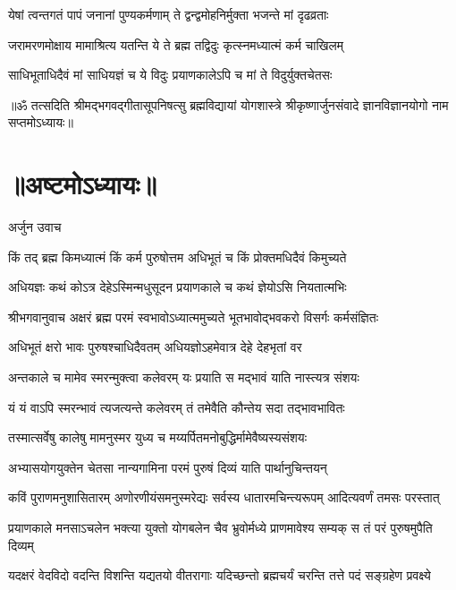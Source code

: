\twolineshloka
{येषां त्वन्तगतं पापं जनानां पुण्यकर्मणाम्}
{ते द्वन्द्वमोहनिर्मुक्ता भजन्ते मां दृढव्रताः}%

\twolineshloka
{जरामरणमोक्षाय मामाश्रित्य यतन्ति ये}
{ते ब्रह्म तद्विदुः कृत्स्नमध्यात्मं कर्म चाखिलम्}%

\twolineshloka
{साधिभूताधिदैवं मां साधियज्ञं च ये विदुः}
{प्रयाणकालेऽपि च मां ते विदुर्युक्तचेतसः}%

{॥ॐ तत्सदिति श्रीमद्भगवद्गीतासूपनिषत्सु ब्रह्मविद्यायां योगशास्त्रे श्रीकृष्णार्जुनसंवादे ज्ञानविज्ञानयोगो नाम सप्तमोऽध्यायः॥}

\section{॥अष्टमोऽध्यायः॥}
{अर्जुन उवाच}

\twolineshloka
{किं तद् ब्रह्म किमध्यात्मं किं कर्म पुरुषोत्तम}
{अधिभूतं च किं प्रोक्तमधिदैवं किमुच्यते}%

\twolineshloka
{अधियज्ञः कथं कोऽत्र देहेऽस्मिन्मधुसूदन}
{प्रयाणकाले च कथं ज्ञेयोऽसि नियतात्मभिः}%

{श्रीभगवानुवाच}
\twolineshloka
{अक्षरं ब्रह्म परमं स्वभावोऽध्यात्ममुच्यते}
{भूतभावोद्भवकरो विसर्गः कर्मसंज्ञितः}%

\twolineshloka
{अधिभूतं क्षरो भावः पुरुषश्चाधिदैवतम्}
{अधियज्ञोऽहमेवात्र देहे देहभृतां वर}%

\twolineshloka
{अन्तकाले च मामेव स्मरन्मुक्त्वा कलेवरम्}
{यः प्रयाति स मद्भावं याति नास्त्यत्र संशयः}%

\twolineshloka
{यं यं वाऽपि स्मरन्भावं त्यजत्यन्ते कलेवरम्}
{तं तमेवैति कौन्तेय सदा तद्भावभावितः}%

\twolineshloka
{तस्मात्सर्वेषु कालेषु मामनुस्मर युध्य च}
{मय्यर्पितमनोबुद्धिर्मामेवैष्यस्यसंशयः}%

\twolineshloka
{अभ्यासयोगयुक्तेन चेतसा नान्यगामिना}
{परमं पुरुषं दिव्यं याति पार्थानुचिन्तयन्}%

\fourlineindentedshloka
{कविं पुराणमनुशासितारम्}
{अणोरणीयंसमनुस्मरेद्यः}
{सर्वस्य धातारमचिन्त्यरूपम्}
{आदित्यवर्णं तमसः परस्तात्}%

\fourlineindentedshloka
{प्रयाणकाले मनसाऽचलेन}
{भक्त्या युक्तो योगबलेन चैव}
{भ्रुवोर्मध्ये प्राणमावेश्य सम्यक्}
{स तं परं पुरुषमुपैति दिव्यम्}%

\fourlineindentedshloka
{यदक्षरं वेदविदो वदन्ति}
{विशन्ति यद्यतयो वीतरागाः}
{यदिच्छन्तो ब्रह्मचर्यं चरन्ति}
{तत्ते पदं सङ्ग्रहेण प्रवक्ष्ये}%

